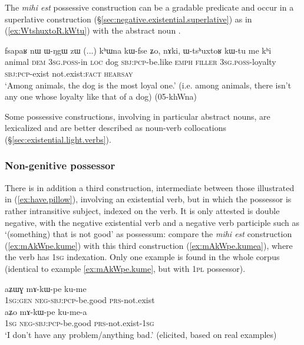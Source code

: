 The \textit{mihi est} possessive construction can be a gradable predicate and occur in a superlative construction (§\ref{sec:negative.existential.superlative}) as in (\ref{ex:WtshuxtoR.kWtu}) with the abstract noun .  

\begin{exe}
\ex \label{ex:WtshuxtoR.kWtu}
\gll  fsapaʁ nɯ ɯ-ŋgɯ zɯ (...) kʰɯna kɯ-fse ʑo, nɤki, ɯ-tsʰuxtoʁ kɯ-tu me kʰi \\
animal \textsc{dem} \textsc{3sg}.\textsc{poss}-in \textsc{loc} {  } dog \textsc{sbj}:\textsc{pcp}-be.like \textsc{emph} \textsc{filler} \textsc{3sg}.\textsc{poss}-loyalty \textsc{sbj}:\textsc{pcp}-exist not.exist:\textsc{fact} \textsc{hearsay} \\
\glt  `Among animals, the dog is the most loyal one.' (i.e. among animals, there isn't any one whose loyalty like that of a dog) (05-khWna)
\end{exe}


Some possessive constructions, involving in particular abstract nouns,  are lexicalized and are better described as noun-verb collocations (§\ref{sec:existential.light.verbs}).

 \subsubsection{Non-genitive possessor} \label{sec:possessive.existential2}
There is in addition a third construction, intermediate between those illustrated in (\ref{ex:have.pillow}), involving an existential verb, but in which the possessor is rather intransitive subject, indexed on the verb. It is only attested is double negative, with the negative existential verb  and a negative verb participle such as  `(something) that is not good' as possessum: compare the \textit{mihi est} construction (\ref{ex:mAkWpe.kume}) with this third construction (\ref{ex:mAkWpe.kumea}), where the verb has \textsc{1sg} indexation. Only one example is found in the whole corpus (identical to example \ref{ex:mAkWpe.kume}, but with \textsc{1pl} possessor).
 
\begin{exe}
\ex 
\begin{xlist}
\ex \label{ex:mAkWpe.kume}
\gll aʑɯɣ mɤ-kɯ-pe ku-me \\
\textsc{1sg}:\textsc{gen} \textsc{neg}-\textsc{sbj}:\textsc{pcp}-be.good \textsc{prs}-not.exist \\
\ex \label{ex:mAkWpe.kumea}
\gll aʑo mɤ-kɯ-pe ku-me-a \\
 \textsc{1sg}  \textsc{neg}-\textsc{sbj}:\textsc{pcp}-be.good \textsc{prs}-not.exist-\textsc{1sg} \\
 \glt `I don't have any problem/anything bad.' (elicited, based on real examples) 
 \end{xlist} 
\end{exe}


